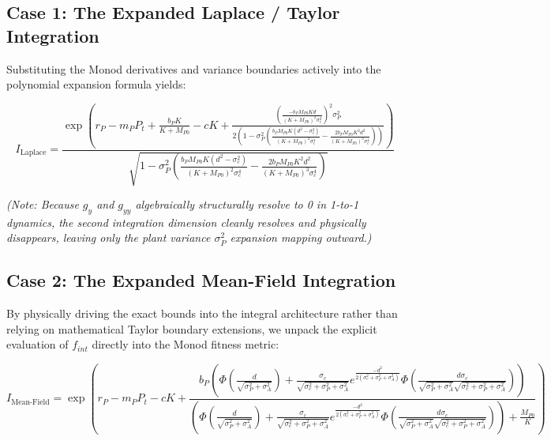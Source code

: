 \documentclass{article}
\begin{document}
\subsection*{Case 1: The Expanded Laplace / Taylor Integration}
Substituting the Monod derivatives and variance boundaries actively into the polynomial expansion formula yields:

\begin{equation}
I_{\text{Laplace}} = \frac{ \exp\left( r_P - m_P P_t + \frac{b_P K}{K + M_{P0}} - c K + \frac{ \left( \frac{-b_P M_{P0} K d}{(K + M_{P0})^2 \sigma_c^2} \right)^2 \sigma_P^2 }{ 2 \left( 1 - \sigma_P^2 \left( \frac{b_P M_{P0} K (d^2 - \sigma_c^2)}{(K + M_{P0})^2 \sigma_c^4} - \frac{2 b_P M_{P0} K^2 d^2}{(K + M_{P0})^3 \sigma_c^4} \right) \right) } \right) } { \sqrt{1 - \sigma_P^2 \left( \frac{b_P M_{P0} K (d^2 - \sigma_c^2)}{(K + M_{P0})^2 \sigma_c^4} - \frac{2 b_P M_{P0} K^2 d^2}{(K + M_{P0})^3 \sigma_c^4} \right) } }
\end{equation}

\textit{(Note: Because $g_y$ and $g_{yy}$ algebraically structurally resolve to 0 in 1-to-1 dynamics, the second integration dimension cleanly resolves and physically disappears, leaving only the plant variance $\sigma_P^2$ expansion mapping outward.)}

\subsection*{Case 2: The Expanded Mean-Field Integration}
By physically driving the exact bounds into the integral architecture rather than relying on mathematical Taylor boundary extensions, we unpack the explicit evaluation of $f_{int}$ directly into the Monod fitness metric:

\begin{equation}
I_{\text{Mean-Field}} = \exp\left( r_P \!-\! m_P P_t \!-\! c K \!+\! \frac{b_P \left( \Phi\left(\frac{d}{\sqrt{\sigma_P^2+\sigma_A^2}}\right) \!+\! \frac{\sigma_c}{\sqrt{\sigma_c^2+\sigma_P^2+\sigma_A^2}} e^{ \frac{-d^2}{2(\sigma_c^2+\sigma_P^2+\sigma_A^2)} } \Phi\left(\!\frac{d \sigma_c}{\sqrt{\sigma_P^2+\sigma_A^2}\sqrt{\sigma_c^2+\sigma_P^2+\sigma_A^2}}\!\right) \right)}{\left( \Phi\left(\frac{d}{\sqrt{\sigma_P^2+\sigma_A^2}}\right) \!+\! \frac{\sigma_c}{\sqrt{\sigma_c^2+\sigma_P^2+\sigma_A^2}} e^{ \frac{-d^2}{2(\sigma_c^2+\sigma_P^2+\sigma_A^2)} } \Phi\left(\!\frac{d \sigma_c}{\sqrt{\sigma_P^2+\sigma_A^2}\sqrt{\sigma_c^2+\sigma_P^2+\sigma_A^2}}\!\right) \right) \!+\! \frac{M_{P0}}{K} } \right)
\end{equation}
\end{document}
